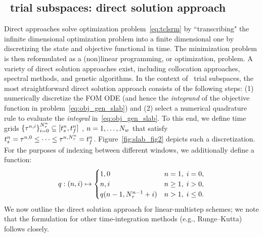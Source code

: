 \subsection{\spatialAcronym\ trial subspaces: direct solution approach}\label{sec:direct} 

Direct approaches solve optimization problem~\eqref{eq:tclsrm} by
``transcribing" the infinite dimensional optimization problem into a finite
dimensional one by discretizing the state and objective functional in time.
The minimization problem is then reformulated as a (non)linear programming, or
optimization, problem. A variety of direct solution approaches exist, 
including collocation approaches, spectral  methods, and genetic algorithms.  
In the context of \spatialAcronym\ trial subspaces, the most straightforward direct solution approach consists of the 
following steps: (1) numerically discretize the FOM ODE (and hence the
\textit{integrand} of the objective function in problem~\eqref{eq:obj_gen_slab}) and 
(2) select a numerical quadrature rule to evaluate the \textit{integral} in~\eqref{eq:obj_gen_slab}.
To this end, we define time grids
$\{\tau^{n,i}\}_{i=0}^{N_{\tau}^{n}}\subseteq[t_s^{n},t_f^{n}]$ ,
$n=1,\ldots,N_w$ that
satisfy 
$t_s^{n}=\tau^{n,0} \le \cdots \le \tau^{n,N_{\tau}^{n}} 
 = t_f^{n}$. %
Figure~\ref{fig:slab_fig2} depicts such a discretization.
For the purposes of indexing between different windows, we additionally define a function:
$$q: (n,i) \mapsto 
\begin{cases}
1,0 & n=1, \; i = 0,\\
n,i & n \ge 1, \; i > 0, \\
q(n-1,N_{\tau}^{n-1}+i) & n > 1, \; i \le 0.
\end{cases}$$
We now outline the direct solution approach for linear-multistep schemes; we note that the formulation for
other time-integration methods (e.g., Runge--Kutta) follows closely. 

